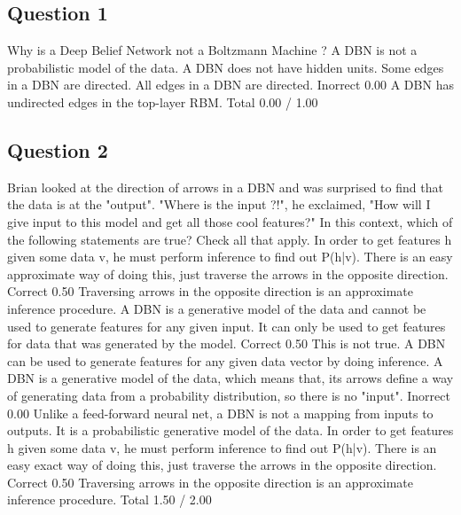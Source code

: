 \subsection*{Question 1}
Why is a Deep Belief Network not a Boltzmann Machine ?
A DBN is not a probabilistic model of the data.			
A DBN does not have hidden units.			
Some edges in a DBN are directed.			
All edges in a DBN are directed.	Inorrect	0.00	A DBN has undirected edges in the top-layer RBM.
Total		0.00 / 1.00	
\subsection*{Question 2}
Brian looked at the direction of arrows in a DBN and was surprised to find that the data is at the "output". "Where is the input ?!", he exclaimed, "How will I give input to this model and get all those cool features?" In this context, which of the following statements are true? Check all that apply.
In order to get features h given some data v, he must perform inference to find out P(h|v). There is an easy approximate way of doing this, just traverse the arrows in the opposite direction.	Correct	0.50	Traversing arrows in the opposite direction is an approximate inference procedure.
A DBN is a generative model of the data and cannot be used to generate features for any given input. It can only be used to get features for data that was generated by the model.	Correct	0.50	This is not true. A DBN can be used to generate features for any given data vector by doing inference.
A DBN is a generative model of the data, which means that, its arrows define a way of generating data from a probability distribution, so there is no "input".	Inorrect	0.00	Unlike a feed-forward neural net, a DBN is not a mapping from inputs to outputs. It is a probabilistic generative model of the data.
In order to get features h given some data v, he must perform inference to find out P(h|v). There is an easy exact way of doing this, just traverse the arrows in the opposite direction.	Correct	0.50	Traversing arrows in the opposite direction is an approximate inference procedure.
Total		1.50 / 2.00
